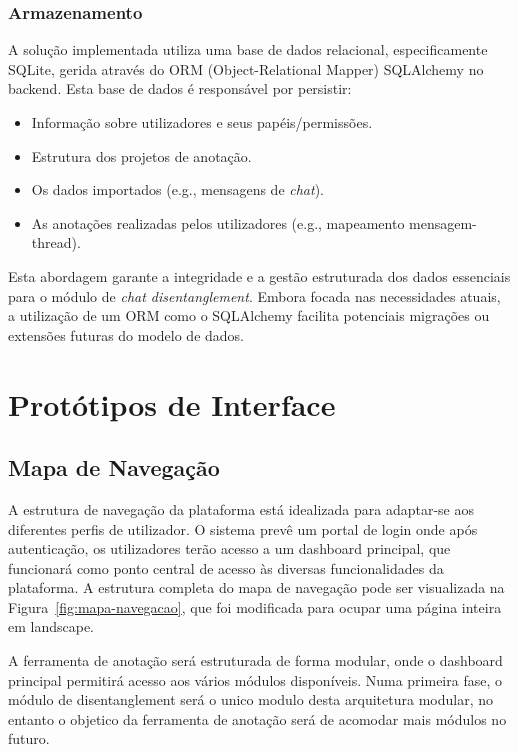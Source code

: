 \subsubsection{Armazenamento}

A solução implementada utiliza uma base de dados relacional, especificamente SQLite, gerida através do ORM (Object-Relational Mapper) SQLAlchemy no backend. Esta base de dados é responsável por persistir:
\begin{itemize}
    \item Informação sobre utilizadores e seus papéis/permissões.
    \item Estrutura dos projetos de anotação.
    \item Os dados importados (e.g., mensagens de \textit{chat}).
    \item As anotações realizadas pelos utilizadores (e.g., mapeamento mensagem-thread).
\end{itemize}
Esta abordagem garante a integridade e a gestão estruturada dos dados essenciais para o módulo de \textit{chat disentanglement}. Embora focada nas necessidades atuais, a utilização de um ORM como o SQLAlchemy facilita potenciais migrações ou extensões futuras do modelo de dados.

\section{Protótipos de Interface}

\subsection{Mapa de Navegação}

A estrutura de navegação da plataforma está idealizada para adaptar-se aos diferentes perfis de utilizador. O sistema prevê um portal de login onde após autenticação, os utilizadores terão acesso a um dashboard principal, que funcionará como ponto central de acesso às diversas funcionalidades da plataforma. A estrutura completa do mapa de navegação pode ser visualizada na Figura~\ref{fig:mapa-navegacao}, que foi modificada para ocupar uma página inteira em landscape.

A ferramenta de anotação será estruturada de forma modular, onde o dashboard principal permitirá acesso aos vários módulos disponíveis. Numa primeira fase, o módulo de disentanglement será o unico modulo desta arquitetura modular, no entanto o objetico da ferramenta de anotação será de acomodar mais módulos no futuro.

